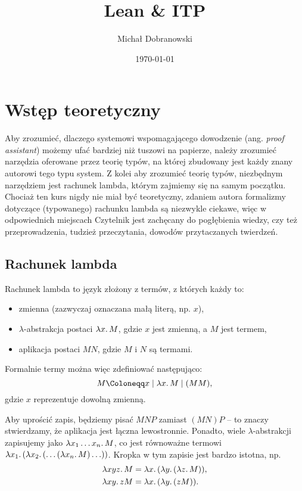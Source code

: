 \documentclass[polish,pretty]{angav}
\title{Lean \& ITP}
\author{Michał Dobranowski}
\date{\today}
\begin{document}
\maketitle
\tableofcontents
\newpage

\section{Wstęp teoretyczny}

Aby zrozumieć, dlaczego systemowi wspomagającego dowodzenie (ang. \textit{proof assistant}) możemy ufać bardziej niż tuszowi na papierze, należy zrozumieć narzędzia oferowane przez teorię typów, na której zbudowany jest każdy znany autorowi tego typu system.
Z kolei aby zrozumieć teorię typów, niezbędnym narzędziem jest rachunek lambda, którym zajmiemy się na samym początku.
Chociaż ten kurs nigdy nie miał być teoretyczny, zdaniem autora formalizmy dotyczące (typowanego) rachunku lambda są niezwykle ciekawe, więc w odpowiednich miejscach Czytelnik jest zachęcany do pogłębienia wiedzy, czy też przeprowadzenia, tudzież przeczytania, dowodów przytaczanych twierdzeń.

\subsection{Rachunek lambda}

Rachunek lambda to język złożony z termów, z których każdy to:
\begin{itemize}
    \item zmienna (zazwyczaj oznaczana małą literą, np. $x$),
    \item $\lambda$-abstrakcja postaci $\lambda x\ldotp M$, gdzie $x$ jest zmienną, a $M$ jest termem,
    \item aplikacja postaci $MN$, gdzie $M$ i $N$ są termami.
\end{itemize}

Formalnie termy można więc zdefiniować następująco:
\[ M \Coloneqq x \mid \lambda x\ldotp M \mid (MM), \]
gdzie $x$ reprezentuje dowolną zmienną.

Aby uprościć zapis, będziemy pisać $MNP$ zamiast $(MN)P$ -- to znaczy stwierdzamy, że aplikacja jest łączna lewostronnie. Ponadto, wiele $\lambda$-abstrakcji zapisujemy jako $\lambda x_1 \ldots x_n\ldotp M$, co jest równoważne termowi $\lambda x_1\ldotp (\lambda x_2\ldotp (\ldots (\lambda x_n\ldotp M) \ldots))$. Kropka w tym zapisie jest bardzo istotna, np.
\begin{align*}
    \lambda xyz\ldotp M &= \lambda x\ldotp (\lambda y\ldotp (\lambda z\ldotp M)), \\
    \lambda xy\ldotp z M &= \lambda x\ldotp (\lambda y\ldotp (z M)).
\end{align*}
\end{document}
